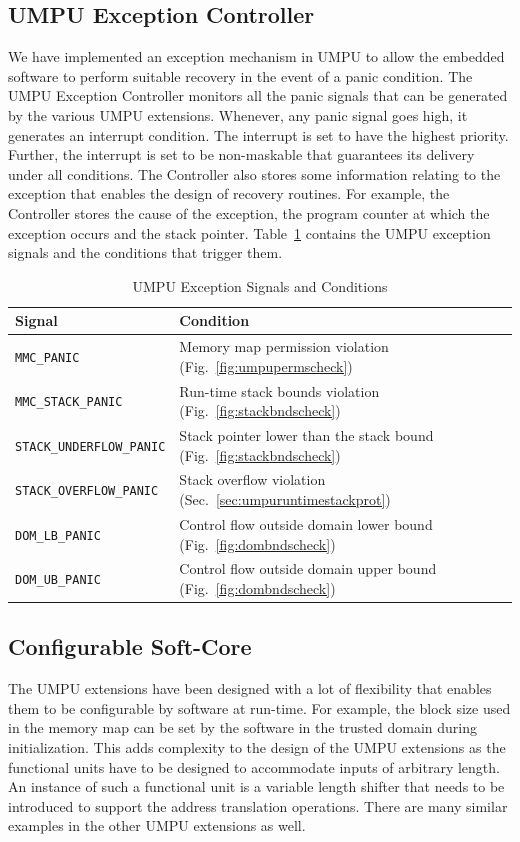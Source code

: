 \subsection{UMPU Exception Controller}
%
We have implemented an exception mechanism in UMPU to allow the
embedded software to perform suitable recovery in the event of a panic
condition.
%
The UMPU Exception Controller monitors all the panic signals that can
be generated by the various UMPU extensions.
%
Whenever, any panic signal goes high, it generates an interrupt
condition.
%
The interrupt is set to have the highest priority.
%
Further, the interrupt is set to be non-maskable that guarantees its
delivery under all conditions.
%
The Controller also stores some information relating to the exception
that enables the design of recovery routines.
%
For example, the Controller stores the cause of the exception, the
program counter at which the exception occurs and the stack pointer.
%
Table~\ref{tab:umpuexceptions} contains the UMPU exception signals and
the conditions that trigger them.
%
\begin{table}[htdp]
\centering
\small{
\begin{tabular}{|l|l|}
	\hline
	Signal & Condition\\
	\hline
	\texttt{MMC\_PANIC} & Memory map permission violation
        (Fig.~\ref{fig:umpupermscheck})\\
	\texttt{MMC\_STACK\_PANIC} & Run-time stack bounds violation
        (Fig.~\ref{fig:stackbndscheck})\\
	\texttt{STACK\_UNDERFLOW\_PANIC} & Stack pointer lower than
        the stack bound (Fig.~\ref{fig:stackbndscheck}) \\
	\texttt{STACK\_OVERFLOW\_PANIC} & Stack overflow violation
        (Sec.~\ref{sec:umpuruntimestackprot})\\
        \texttt{DOM\_LB\_PANIC} & Control flow outside domain lower
        bound (Fig.~\ref{fig:dombndscheck})\\
        \texttt{DOM\_UB\_PANIC} & Control flow outside domain upper
        bound (Fig.~\ref{fig:dombndscheck})\\
	\hline
\end{tabular}}
\caption{UMPU Exception Signals and Conditions}
\label{tab:umpuexceptions}
\end{table}

\subsection{Configurable Soft-Core}
%
The UMPU extensions have been designed with a lot of flexibility that
enables them to be configurable by software at run-time.
%
For example, the block size used in the memory map can be set by
the software in the trusted domain during initialization.
%
This adds complexity to the design of the UMPU extensions as the
functional units have to be designed to accommodate inputs of arbitrary
length.
%
An instance of such a functional unit is a variable length shifter that
needs to be introduced to support the address translation operations.
%
There are many similar examples in the other UMPU extensions as well.

